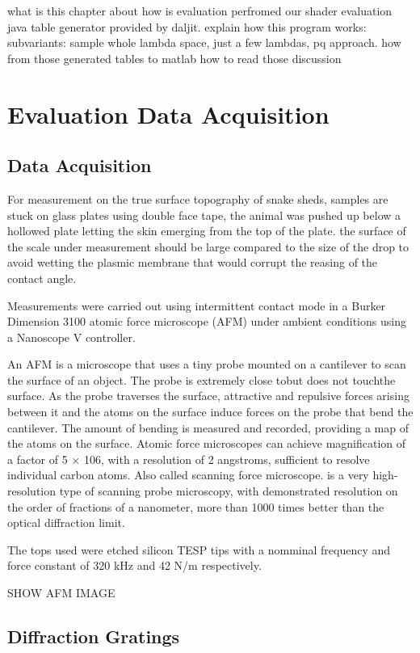 what is this chapter about
how is evaluation perfromed
our shader
evaluation java table generator provided by daljit.
explain how this program works:
subvariants: sample whole lambda space, just a few lambdas, pq approach.
how from those generated tables to matlab
how to read those
discussion


\chapter{Evaluation Data Acquisition}
\section{Data Acquisition}
For measurement on the true surface topography of snake sheds, samples are stuck on glass plates using double face tape, the animal was pushed up below a hollowed plate letting the skin emerging from the top of the plate. the surface of the scale under measurement should be large compared to the size of the drop to avoid wetting the plasmic membrane that would corrupt the reasing of the contact angle. 

Measurements were carried out using intermittent contact mode in a Burker Dimension 3100 atomic force microscope (AFM) under ambient conditions using a Nanoscope V controller. 

An AFM is a microscope that uses a tiny probe mounted on a cantilever to scan the surface of an object. The probe is extremely close tobut does not touchthe surface. As the probe traverses the surface, attractive and repulsive forces arising between it and the atoms on the surface induce forces on the probe that bend the cantilever. The amount of bending is measured and recorded, providing a map of the atoms on the surface. Atomic force microscopes can achieve magnification of a factor of 5 × 106, with a resolution of 2 angstroms, sufficient to resolve individual carbon atoms. Also called scanning force microscope.
is a very high-resolution type of scanning probe microscopy, with demonstrated resolution on the order of fractions of a nanometer, more than 1000 times better than the optical diffraction limit.

The tops used were etched silicon TESP tips with a nomminal frequency and force constant of 320 kHz and 42 N/m respectively. 

SHOW AFM IMAGE

\section{Diffraction Gratings}

